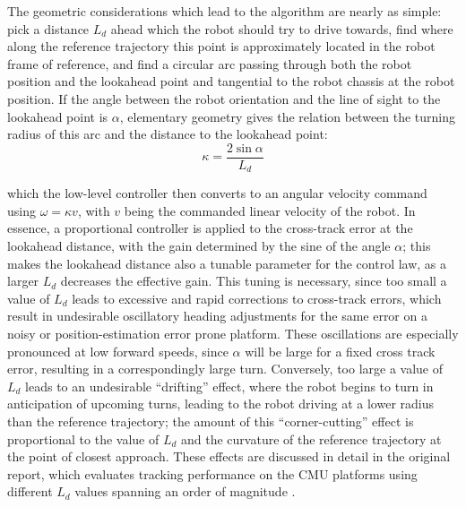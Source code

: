 The geometric considerations which lead to the algorithm are nearly as simple: pick a distance $L_d$ ahead which the robot should try to drive towards, find where along the reference trajectory this point is approximately located in the robot frame of reference, and find a circular arc passing through both the robot position and the lookahead point and tangential to the robot chassis at the robot position. If the angle between the robot orientation and the line of sight to the lookahead point is $\alpha$, elementary geometry gives the relation between the turning radius of this arc and the distance to the lookahead point:
\begin{equation}
\kappa = \frac{2 \sin \alpha}{L_d} \label{eq:pure_pursuit_curvature}
\end{equation}

which the low-level controller then converts to an angular velocity command using $\omega = \kappa v$, with $v$ being the commanded linear velocity of the robot. In essence, a proportional controller is applied to the cross-track error at the lookahead distance, with the gain determined by the sine of the angle $\alpha$; this makes the lookahead distance also a tunable parameter for the control law, as a larger $L_d$ decreases the effective gain. This tuning is necessary, since too small a value of $L_d$ leads to excessive and rapid corrections to cross-track errors, which result in undesirable oscillatory heading adjustments for the same error on a noisy or position-estimation error prone platform. These oscillations are especially pronounced at low forward speeds, since $\alpha$ will be large for a fixed cross track error, resulting in a correspondingly large turn. Conversely, too large a value of $L_d$ leads to an undesirable ``drifting'' effect, where the robot begins to turn in anticipation of upcoming turns, leading to the robot driving at a lower radius than the reference trajectory; the amount of this ``corner-cutting'' effect is proportional to the value of $L_d$ and the curvature of the reference trajectory at the point of closest approach. These effects are discussed in detail in the original report, which evaluates tracking performance on the CMU platforms using different $L_d$ values spanning an order of magnitude \cite{coulter1992implementation}.

